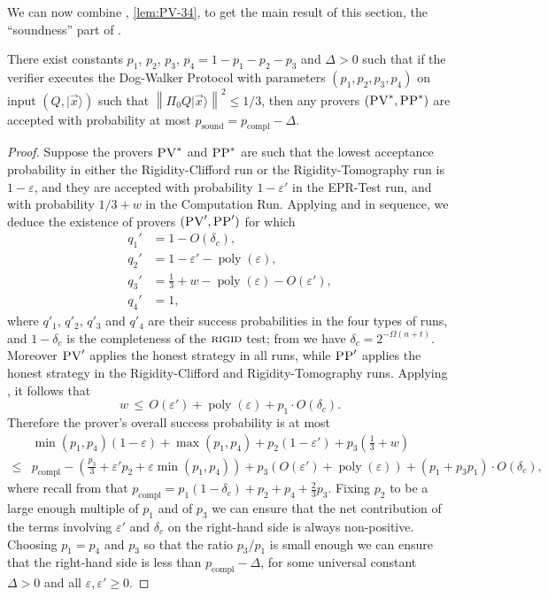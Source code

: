 \documentclass{toc}
\newcommand{\ket}[1]{|#1\rangle}
\DeclareMathOperator{\poly}{poly}
\DeclareMathOperator{\sound}{sound}
\DeclareMathOperator{\compl}{compl}
\newcommand{\norm}[1]{\left\|#1\right\|}
\newcommand{\eps}{\varepsilon}
\newcommand{\rigid}{\textsc{rigid}}
\newcommand{\pv}{\textsc{PV}}
\newcommand{\pp}{\textsc{PP}}
\begin{document}
We can now combine , \ref{lem:PV-34},  to get the main result of this section, the ``soundness'' part of .

\begin{lemma}\label{lem:dogwalker-soundness}
 There exist constants $p_1$, $p_2$, $p_3$, $p_4=1-p_1-p_2-p_3$ and $\Delta>0$ such that if the verifier executes the Dog-Walker Protocol with parameters $(p_1,p_2,p_3,p_4)$ on input $(Q,\ket{\vec{x}})$ such that $\norm{\Pi_0 Q\ket{\vec{x}}}^2\leq 1/3$, then any provers $(\pv^*,\pp^*)$ are accepted with probability at most $p_{\sound}=p_{\compl}-\Delta$. 
\end{lemma}

\begin{proof}
Suppose the provers $\pv^*$ and $\pp^*$ are such that the lowest acceptance probability in either the Rigidity-Clifford run or the Rigidity-Tomography run is $1- \eps$, and they are accepted with probability $1-\eps'$ in the EPR-Test run, and with probability $1/3+w$ in the Computation Run. Applying   and  in sequence, we deduce the existence of provers $(\pv',\pp')$ for which
\begin{align*}
q_1' &= 1- O(\delta_c), \\  q_2' &= 1-\eps'- \poly(\eps), \\ q_3' &= \frac13+w-
  \poly(\eps)-O(\eps'),\\ q_4' &= 1,
\end{align*}
where $q'_1$, $q'_2$, $q'_3$ and $q'_4$ are their success probabilities in the
  four types of runs, and $1-\delta_c$ is the completeness of the
  $\rigid$ test; from  we have $\delta_c = 2^{-\Omega(n+t)}$. Moreover $\pv'$ applies the honest strategy in all runs, while $\pp'$ applies the honest strategy in the Rigidity-Clifford and Rigidity-Tomography runs. Applying , it follows that 
$$w \,\leq\, O(\eps') + \poly(\eps) +p_1 \cdot O(\delta_c).$$
Therefore the prover's overall success probability is at most 
\begin{align*}
& \min(p_1,p_4)(1-\eps)+\max(p_1,p_4) + p_2(1-\eps')+p_3\left(\frac{1}{3}+w\right) \\
\leq & p_{\compl} - \left( \frac{p_3}{3} + \eps' p_2+\eps\min(p_1,p_4)\right)+ p_3\left(O(\eps')+\poly(\eps)\right)+ (p_1 + p_3p_1) \cdot O(\delta_c),
\end{align*}
where recall from  that
  $p_{\compl} =  p_1(1-\delta_c)+p_2+p_4+\frac{2}{3}p_3$. Fixing $p_2$
  to be a large enough multiple of $p_1$ and of $p_3$ we can ensure that the net contribution
  of the terms involving $\eps'$ and $\delta_c$ on the right-hand side is always
  non-positive. Choosing $p_1=p_4$ and $p_3$ so that the ratio $p_3/p_1$ is small
  enough we can ensure that the right-hand side is less than $p_{\compl}
  -\Delta$, for some universal constant $\Delta>0$ and all $\eps,\eps'\geq 0$.
\end{proof}
\end{document}
